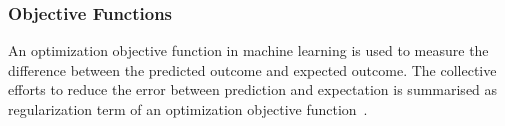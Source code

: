 \subsubsection{Objective Functions}
An optimization objective function  in machine learning is used to measure the difference between the predicted outcome and expected outcome. The collective efforts to reduce the error between prediction and expectation is summarised as regularization term of an optimization objective function~\cite{goodfellow_2015}.  